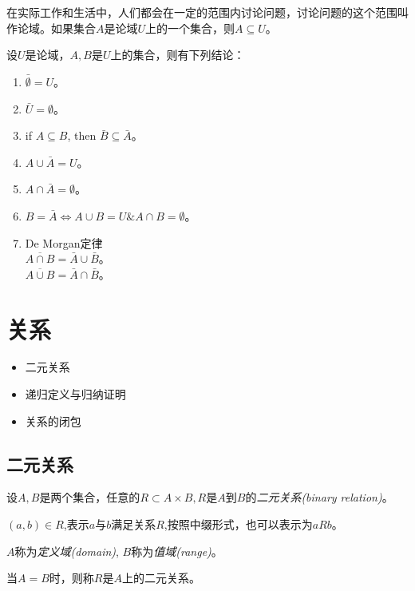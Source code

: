 在实际工作和生活中，人们都会在一定的范围内讨论问题，讨论问题的这个范围叫作论域。如果集合$A$是论域$U$上的一个集合，则$A\subseteq U$。

设$U$是论域，$A,B$是$U$上的集合，则有下列结论：
\begin{enumerate}
	\item $\bar{\emptyset}=U$。
	\item $\bar{U}=\emptyset$。
	\item if $A\subseteq B$, then $\bar{B}\subseteq \bar{A}$。
	\item $A\cup \bar{A}=U$。
	\item $A\cap \bar{A}=\emptyset$。
	\item $B=\bar{A}\iff A\cup B=U\& A\cap B=\emptyset$。
	\item De Morgan定律\\ 
	$\overline{A\cap B}=\bar{A}\cup\bar{B}$。\\
	$\overline{A\cup B}=\bar{A}\cap\bar{B}$。
\end{enumerate}


\section{关系}
\begin{itemize}
	\item 二元关系 
	\item 递归定义与归纳证明 
	\item 关系的闭包 
\end{itemize}

\subsection{二元关系}

\begin{definition}
	设$A,B$是两个集合，任意的$R\subset A\times B,R$是$A$到$B$的\emph{二元关系(binary relation)}。
	
	$(a,b)\in R$,表示$a$与$b$满足关系$R$,按照中缀形式，也可以表示为$aRb$。
	
	$A$称为\emph{定义域(domain)}, $B$称为\emph{值域(range)}。
	
	当$A=B$时，则称$R$是$A$上的二元关系。
\end{definition}

